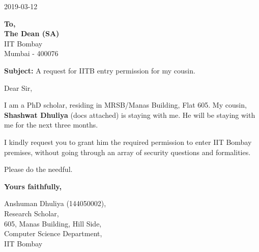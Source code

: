 \documentclass{article}
\begin{document}
\begin{center}
2019-03-12
\end{center}
\vspace{4ex}

\noindent\textbf{To,\\The Dean (SA)}\\IIT Bombay\\Mumbai - 400076
\vspace{4ex}

\noindent\textbf{Subject:} A request for IITB entry permission for my cousin.

\vspace{4ex}
\noindent{}Dear Sir,
\vspace{2ex}

\noindent{}I am a PhD scholar, residing in MRSB/Manas Building, Flat 605. My cousin, \textbf{Shashwat Dhuliya} (docs attached) is staying with me. He will be staying with me for the next three months.
\vspace{2ex}

\noindent{}I kindly request you to grant him the required permission to enter IIT Bombay premises, without going through an array of security questions and formalities.
\vspace{2ex}

\noindent{}Please do the needful.
\vspace{2ex}

\vspace{8ex}
\noindent{}\textbf{Yours faithfully,}
\vspace{8ex}

\noindent{}Anshuman Dhuliya (144050002),\\
Research Scholar,\\
605, Manas Building, Hill Side,\\
Computer Science Department,\\
IIT Bombay
\end{document}
